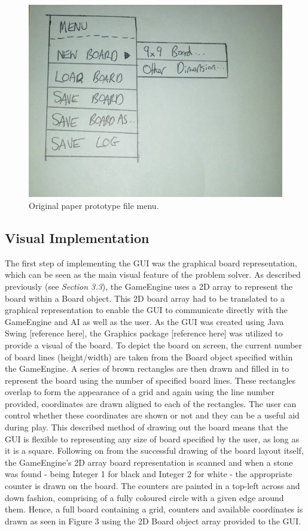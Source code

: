 \documentclass{l3proj}
\begin{document}
\begin{figure}[H]
\centering
\includegraphics[scale=0.4]{Images/GUI-2-PP.png}
\caption{Original paper prototype file menu.}
\end{figure}

\subsection{Visual Implementation}

The first step of implementing the GUI was the graphical board representation, which can be seen as the main visual feature of the problem solver. As described previously (see \textit{Section 3.3}), the GameEngine uses a 2D array to represent the board within a Board object. This 2D board array had to be translated to a graphical representation to enable the GUI to communicate directly with the GameEngine and AI as well as the user. As the GUI was created using Java Swing [reference here], the Graphics package [reference here] was utilized to provide a visual of the board. To depict the board on screen, the current number of board lines (height/width) are taken from the Board object specified within the GameEngine. A series of brown rectangles are then drawn and filled in to represent the board using the number of specified board lines. These rectangles overlap to form the appearance of a grid and again using the line number provided, coordinates are drawn aligned to each of the rectangles. The user can control whether these coordinates are shown or not and they can be a useful aid during play. This described method of drawing out the board means that the GUI is flexible to representing any size of board specified by the user, as long as it is a square. Following on from the successful drawing of the board layout itself, the GameEngine's 2D array board representation is scanned and when a stone was found - being Integer 1 for black and Integer 2 for white - the appropriate counter is drawn on the board. The counters are painted in a top-left across and down fashion, comprising of a fully coloured circle with a given edge around them. Hence, a full board containing a grid, counters and available coordinates is drawn as seen in Figure 3 using the 2D Board object array provided to the GUI.
\end{document}

